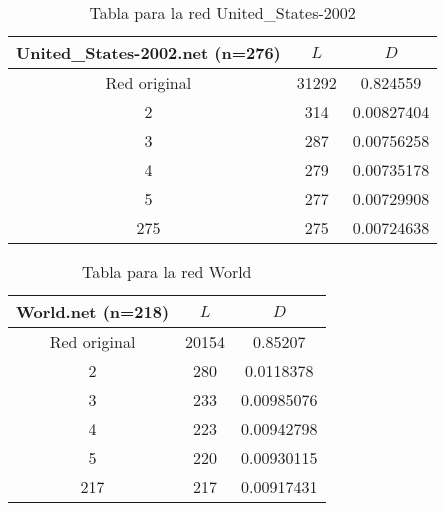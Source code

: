 \begin{table}[H]
  \caption{Tabla para la red United\_States-2002}
  \begin{tabular}{ccc}
    \hline
    United\_States-2002.net
    (n=276)              &   $L$ &   $D$ \\
    \hline
    Red original &               31292 & 0.824559   \\
    2            &                 314 & 0.00827404 \\
    3            &                 287 & 0.00756258 \\
    4            &                 279 & 0.00735178 \\
    5            &                 277 & 0.00729908 \\
    275          &                 275 & 0.00724638 \\
    \hline
  \end{tabular}  
\end{table}
\begin{table}[H]
  \caption{Tabla para la red World}
  \begin{tabular}{ccc}
    \hline
    World.net
    (n=218)              &   $L$ &   $D$ \\
    \hline
    Red original &               20154 & 0.85207    \\
    2            &                 280 & 0.0118378  \\
    3            &                 233 & 0.00985076 \\
    4            &                 223 & 0.00942798 \\
    5            &                 220 & 0.00930115 \\
    217          &                 217 & 0.00917431 \\
    \hline
  \end{tabular}
\end{table}
